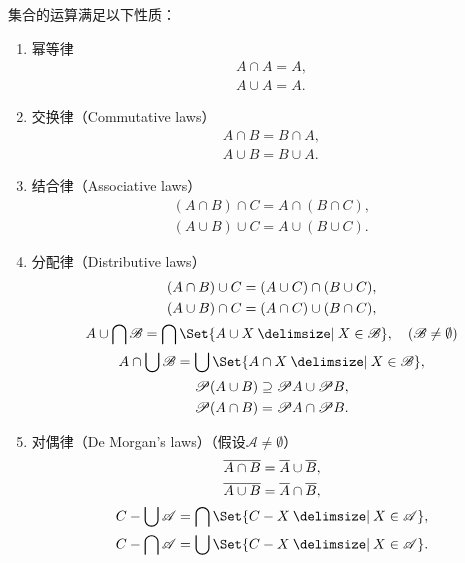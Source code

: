 \begin{property}
集合的运算满足以下性质：
\begin{enumerate}
\item 幂等律
\begin{gather}
	A \cap A = A, \\
	A \cup A = A.
\end{gather}

\item 交换律（{\rm Commutative laws}）
\begin{gather}
	A \cap B = B \cap A, \label{equation:集合论.集合代数公式1-1} \\
	A \cup B = B \cup A. \label{equation:集合论.集合代数公式1-2}
\end{gather}

\item 结合律（{\rm Associative laws}）
\begin{gather}
	(A \cap B) \cap C = A \cap (B \cap C), \label{equation:集合论.集合代数公式2-1} \\
	(A \cup B) \cup C = A \cup (B \cup C). \label{equation:集合论.集合代数公式2-2}
\end{gather}

\item 分配律（{\rm Distributive laws}）
\begin{gather}
	(A \cap B) \cup C = (A \cup C) \cap (B \cup C), \label{equation:集合论.集合代数公式3-1} \\
	(A \cup B) \cap C = (A \cap C) \cup (B \cap C), \label{equation:集合论.集合代数公式3-2} \\
	A \cup \bigcap \mathscr{B} = \bigcap\Set{A \cup X \given X \in \mathscr{B}}, \quad(\mathscr{B}\neq\emptyset) \label{equation:集合论.集合代数公式3-3} \\
	A \cap \bigcup \mathscr{B} = \bigcup\Set{A \cap X \given X \in \mathscr{B}}, \label{equation:集合论.集合代数公式3-4} \\
	\Powerset (A \cup B) \supseteq \Powerset A \cup \Powerset B, \label{equation:集合论.集合代数公式3-5} \\ %
	\Powerset (A \cap B) = \Powerset A \cap \Powerset B. \label{equation:集合论.集合代数公式3-6} %
\end{gather}

\item 对偶律（{\rm De Morgan's laws}）（假设\(\mathscr{A}\neq\emptyset\)）
\begin{gather}
	\overline{A \cap B} = \overline A \cup \overline B, \label{equation:集合论.集合代数公式4-1} \\
	\overline{A \cup B} = \overline A \cap \overline B, \label{equation:集合论.集合代数公式4-2} \\
	C - \bigcup\mathscr{A} = \bigcap\Set{C-X \given X\in\mathscr{A}}, \label{equation:集合论.集合代数公式4-3} \\
	C - \bigcap\mathscr{A} = \bigcup\Set{C-X \given X\in\mathscr{A}}. \label{equation:集合论.集合代数公式4-4}
\end{gather}


\end{enumerate}
\end{property}
